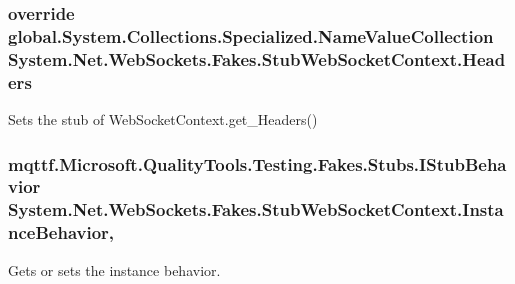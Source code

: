 \hypertarget{class_system_1_1_net_1_1_web_sockets_1_1_fakes_1_1_stub_web_socket_context_a3beecd6512c064c4fdb4f9727d5e4666}{
\subsubsection[{Headers}]{\setlength{\rightskip}{0pt plus 5cm}override global.\-System.\-Collections.\-Specialized.\-Name\-Value\-Collection System.\-Net.\-Web\-Sockets.\-Fakes.\-Stub\-Web\-Socket\-Context.\-Headers\hspace{0.3cm}{\ttfamily [get]}}}\label{class_system_1_1_net_1_1_web_sockets_1_1_fakes_1_1_stub_web_socket_context_a3beecd6512c064c4fdb4f9727d5e4666}


Sets the stub of Web\-Socket\-Context.\-get\-\_\-\-Headers()

\hypertarget{class_system_1_1_net_1_1_web_sockets_1_1_fakes_1_1_stub_web_socket_context_a170f439fe92860b246b4a36aa1d2e377}{
\subsubsection[{Instance\-Behavior}]{\setlength{\rightskip}{0pt plus 5cm}mqttf.\-Microsoft.\-Quality\-Tools.\-Testing.\-Fakes.\-Stubs.\-I\-Stub\-Behavior System.\-Net.\-Web\-Sockets.\-Fakes.\-Stub\-Web\-Socket\-Context.\-Instance\-Behavior\hspace{0.3cm}{\ttfamily [get]}, {\ttfamily [set]}}}\label{class_system_1_1_net_1_1_web_sockets_1_1_fakes_1_1_stub_web_socket_context_a170f439fe92860b246b4a36aa1d2e377}


Gets or sets the instance behavior.

